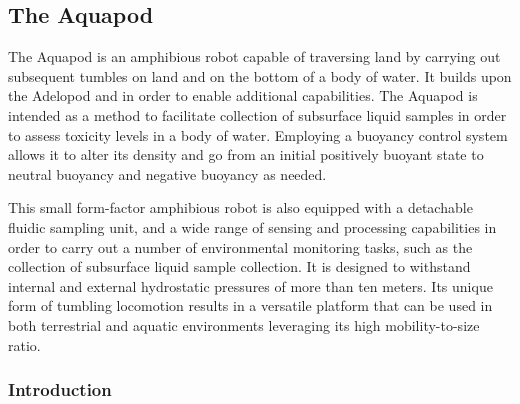 %

%



\subsection{The Aquapod}


The Aquapod is an amphibious robot capable of traversing land by carrying out subsequent tumbles on land and on the bottom of a body of water. It builds upon the Adelopod \cite{Hemes2009} and \cite{Carlson2011} in order to enable additional capabilities.  The Aquapod is intended as a method to facilitate collection of subsurface liquid samples in order to assess toxicity levels in a body of water. Employing a buoyancy control system allows it to alter its density and go from an initial positively buoyant state to neutral buoyancy and negative buoyancy as needed.


This small form-factor amphibious robot is also equipped with a detachable fluidic sampling unit, and a wide range of sensing and processing capabilities in order to carry out a number of environmental monitoring tasks, such as the collection of subsurface liquid sample collection.  It is designed to withstand internal and external hydrostatic pressures of more than ten meters. Its unique form of tumbling locomotion results in a versatile platform that can be used in both terrestrial and aquatic environments leveraging its high mobility-to-size ratio.


\subsubsection{Introduction}


